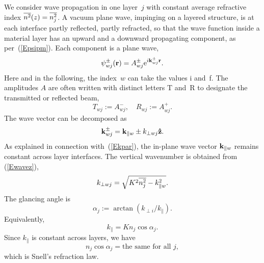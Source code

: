We consider wave propagation in one layer~$j$
%
with constant average refractive index $\overline{n^2}(z)=\overline{n_j^2}$.
A vacuum plane wave, impinging on a layered structure,
is at each interface partly reflected, partly refracted,
so that the wave function inside a material layer
has an upward and a downward propagating component,
as per~(\ref{Epsipm}).
Each component is a plane wave,
\begin{equation}
  \psi^\pm_{wj}(\mathbf{r})=A^\pm_{wj}\text{e}^{i\mathbf{k}^\pm_{wj}\mathbf{r}}.
\end{equation}
%
Here and in the following,
the index~$w$ can take the values i and~f.
The amplitudes $A$ are often written with distinct letters
T and~R to designate the transmitted or reflected beam,
\begin{equation}
  T_{wj} := A^-_{wj},\quad
  R_{wj} := A^+_{wj}.
\end{equation}
%
%
The wave vector can be decomposed as
\begin{equation}
  \mathbf{k}^\pm_{wj}= \mathbf{k}_{\parallel w} \pm k_{\perp wj}\mathbf{\hat z}.
\end{equation}
%
%
As explained in connection with~(\ref{Ekpar}),
the in-plane wave vector $\mathbf{k}_{\parallel w}$ remains constant
across layer interfaces.
The vertical wavenumber is obtained from (\ref{Ewavez}),
\begin{equation}
  k_{\perp wj} = \sqrt{K^2 \overline{n_j^2} - k_{\parallel w}^2}.
\end{equation}
The glancing angle is
\begin{equation}\label{Edef_alpha}
  \alpha_j:=\arctan(k_{\perp i}/k_\parallel).  
\end{equation}
Equivalently,
\begin{equation}
  k_\parallel=K n_j \cos\alpha_j. 
\end{equation}
Since $k_\parallel$ is constant across layers,
we have
\begin{equation}\label{ESnell}
  n_j \cos\alpha_j = \text{the same for all }j,
\end{equation}
which is Snell's refraction law.

